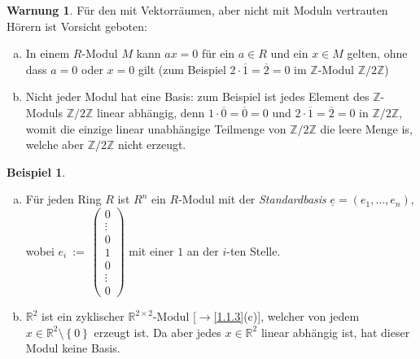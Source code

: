 \documentclass[
twoside=semi,
fontsize=12,
DIV=12, 
cleardoublepage=current,
leqno,
headings=optiontoheadandtoc, 
toc=idx
]{scrbook}
\newcommand{\Z}{\mathbb{Z}}
\newcommand{\R}{\mathbb{R}}
\newcommand{\set}[1]{\left\{ #1 \right\}}
\theoremstyle{definition}
\newtheorem{beispiel}[definition]{Beispiel}
\newtheorem{warnung}[definition]{Warnung}
\begin{document}
	\begin{warnung}\label{1.1.6}\hfill\newline
		F\"ur den mit Vektorr\"aumen, aber nicht mit Moduln vertrauten H\"orern ist Vorsicht geboten:
		\begin{enumerate}[(a)]
			\item In einem $R$-Modul $M$ kann $ax = 0$ f\"ur ein $a \in R$ und ein $x \in M$ gelten, ohne dass $a = 0$ oder $x = 0$ gilt (zum Beispiel $2 \cdot \overline{1} = \overline{2} = 0$ im $\Z$-Modul $\Z/2\Z$)
			
			\item Nicht jeder Modul hat eine Basis:
			zum Beispiel ist jedes Element des $\Z$-Moduls $\Z/2\Z$ linear abh\"angig, denn $1 \cdot \overline{0} = \overline{0} = 0$ und $2 \cdot \overline{1} = \overline{2} = 0$ in $\Z/2\Z$, womit die einzige linear unabh\"angige Teilmenge von $\Z/2\Z$ die leere Menge is, welche aber $\Z/2\Z$ nicht erzeugt.
		\end{enumerate}
	\end{warnung}	

	\begin{beispiel}\label{1.1.7}\hfill
		\begin{enumerate}[(a)]
			\item F\"ur jeden Ring $R$ ist $R^n$ ein $R$-Modul mit der \emph{Standardbasis} $\underline{e} = (e_1, \dots, e_n)$, wobei $e_i~:=~\begin{pmatrix}
				0\\
				\vdots\\
				0\\
				1\\
				0\\
				\vdots\\
				0
			\end{pmatrix}$ mit einer $1$ an der $i$-ten Stelle.
		
			\item $\R^2$ ist ein zyklischer $\R^{2 \times 2}$-Modul [$\to$\ref{1.1.3}(c)], welcher von jedem $x \in \R^2 \setminus \set{0}$ erzeugt ist. Da aber jedes $x \in \R^2$ linear abh\"angig ist, hat dieser Modul keine Basis.  
		\end{enumerate}
	\end{beispiel}
	
	
	\newpage
\end{document}
